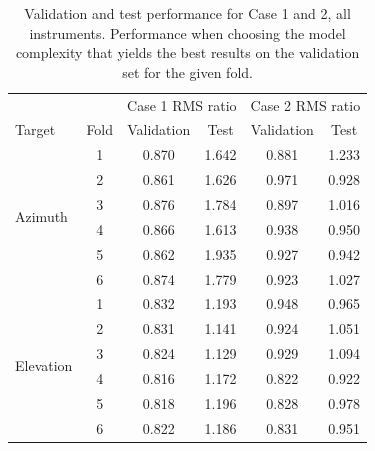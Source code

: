 \newpage 
\begin{table}[!htbp]
    \centering
    \caption[why no work]{Validation and test performance for Case 1 and 2, all instruments.
    Performance when choosing the model complexity that yields the best results on the validation set for the given fold.}
    \begin{tabular}{lccccc}
        \toprule
        & & \multicolumn{2}{c}{Case 1 RMS ratio} & \multicolumn{2}{c}{Case 2 RMS ratio} \\
        \cmidrule{3-4} \cmidrule{5-6}
        Target & Fold & Validation & Test &  Validation &  Test \\
        \midrule
        \multirow{6}{*}{Azimuth} & 1 &  0.870 &       1.642 &      0.881 &       1.233 \\
                            & 2 &  0.861 &       1.626 &      0.971 &       0.928 \\
                            & 3 &  0.876 &       1.784 &      0.897 &       1.016 \\
                            & 4 &  0.866 &       1.613 &      0.938 &       0.950 \\
                            & 5 &  0.862 &       1.935 &      0.927 &       0.942 \\
                            & 6 &  0.874 &       1.779 &      0.923 &       1.027 \\
                            \hline
        \multirow{6}{*}{Elevation} & 1 &  0.832 &       1.193 &      0.948 &       0.965 \\
                            & 2 &  0.831 &       1.141 &      0.924 &       1.051 \\
                            & 3 &  0.824 &       1.129 &      0.929 &       1.094 \\
                            & 4 &  0.816 &       1.172 &      0.822 &       0.922 \\
                            & 5 &  0.818 &       1.196 &      0.828 &       0.978 \\
                            & 6 &  0.822 &       1.186 &      0.831 &       0.951 \\
                            \bottomrule
    \end{tabular}
    \label{tab:results_minval_val_test_days_04_all}
\end{table}


